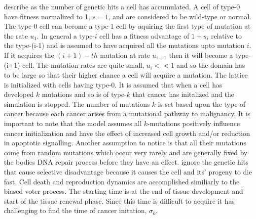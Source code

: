 \documentclass[\main/thesis.tex]{subfiles}
\begin{document}
describe as the number of genetic hits a cell has accumulated. A cell of type-0 
have fitness normalized to 1, $s {=} 1$, and are considered to be wild-type or 
normal. The type-0 cell can become a type-1 cell by aquiring the first type of 
mutation at the rate $u_1$. In general a type-$i$ cell has a fitness advantage 
of $1 + s_i$ relative to the type-(i-1) and is assumed to have acquired all the 
mutations upto mutation $i$. If it acquires the $(i+1)-th$ mutation at rate 
$u_{i{+}1}$ then it will become a type-(i+1) cell. The mutation rates are quite 
small, $u_i << 1$ and so the domain has to be large so that their higher chance 
a cell will acquire a mutation. The lattice is initialized with cells having 
type-0. It is assumed that when a cell has developed $k$ mutations and so is of 
type-$k$ that cancer has initalized and the simulation is stopped. The number of 
mutations $k$ is set based upon the type of cancer because each cancer arises 
from a mutational pathway to malignancy. It is important to note that the model 
assumes all $k$-mutations positively influence cancer initialization and have 
the effect of increased cell growth and/or reduction in apoptotic signalling. 
Another assumption to notice is that all their mutations come from random 
mutations which occur very rarely and are generally fixed by the bodies DNA 
repair process before they have an effect. \textcite{Foo} ignore the genetic 
hits that cause selective disadvantage because it causes the cell and its' 
progeny to die fast. Cell death and reproduction dynamics are accomplished 
similiarly to the biased voter process. The starting time is at the end of 
tissue development and start of the tissue renewal phase. Since this time is 
difficult to acquire it has challenging to find the time of cancer initation, 
$\sigma_k$.
\end{document}
